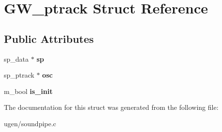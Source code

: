 \hypertarget{structGW__ptrack}{}\section{G\+W\+\_\+ptrack Struct Reference}
\label{structGW__ptrack}
\subsection*{Public Attributes}
\begin{DoxyCompactItemize}
\item 
\hypertarget{structGW__ptrack_ac24588269251661c425232406aabb3f1}{}\label{structGW__ptrack_ac24588269251661c425232406aabb3f1} 
sp\+\_\+data $\ast$ {\bfseries sp}
\item 
\hypertarget{structGW__ptrack_adfaae862f0e7318e874be4ba1da13981}{}\label{structGW__ptrack_adfaae862f0e7318e874be4ba1da13981} 
sp\+\_\+ptrack $\ast$ {\bfseries osc}
\item 
\hypertarget{structGW__ptrack_a69aa17ce98e70e99d92dc9fa3ed57fd1}{}\label{structGW__ptrack_a69aa17ce98e70e99d92dc9fa3ed57fd1} 
m\+\_\+bool {\bfseries is\+\_\+init}
\end{DoxyCompactItemize}


The documentation for this struct was generated from the following file\+:\begin{DoxyCompactItemize}
\item 
ugen/soundpipe.\+c\end{DoxyCompactItemize}
